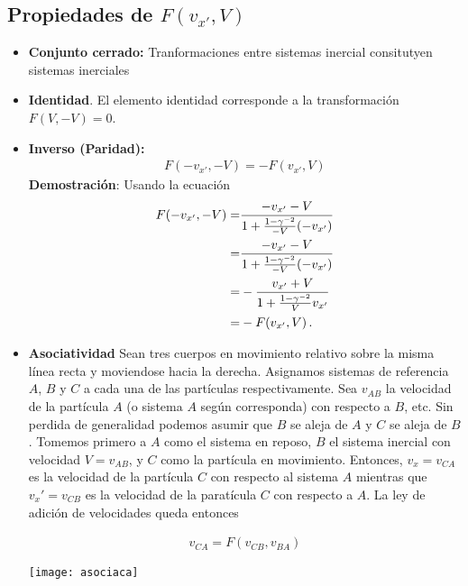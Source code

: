 \subsection{Propiedades de $F(v_{x'},V)$}
\begin{frame}
\begin{itemize}
\item \textbf{Conjunto cerrado:} Tranformaciones entre sistemas
  inercial consitutyen sistemas inerciales
\item \textbf{Identidad}. El elemento identidad corresponde a la
  transformación $F(V,-V)=0$.
\item \textbf{Inverso (Paridad):}
  \begin{align}
    \label{eq:paridad}
    F(-v_{x'},-V)=-F(v_{x'},V)
  \end{align}
\textbf{Demostración}: Usando la ecuación 
\begin{align*}
  F(-v_{x'},-V)=&\frac{-v_{x'}-V}{1+\frac{1-\gamma^{-2}}{-V}(-v_{x'})}\nonumber\\
   =&\frac{-v_{x'}-V}{1+\frac{1-\gamma^{-2}}{-V}(-v_{x'})}\nonumber\\
   =&-\frac{v_{x'}+V}{1+\frac{1-\gamma^{-2}}{V}v_{x'}}\nonumber\\
   =&-F(v_{x'},V)\,.
\end{align*}

\item \textbf{Asociatividad}
Sean tres cuerpos en movimiento relativo sobre la misma línea recta y
moviendose hacia la derecha. Asignamos sistemas de referencia $A$, $B$
y $C$ a cada una de las partículas respectivamente. Sea $v_{AB}$ la
velocidad de la partícula $A$ (o sistema $A$ según corresponda) con
respecto a $B$, etc. Sin perdida de generalidad podemos asumir que $B$
se aleja de $A$ y $C$ se aleja de $B$. Tomemos primero a $A$ como el
sistema en reposo, $B$ el sistema inercial con velocidad $V=v_{AB}$, y
$C$ como la partícula en movimiento. Entonces, $v_x=v_{CA}$ es la
velocidad de la partícula $C$ con respecto al sistema $A$ mientras que
$v_x'=v_{CB}$ es la velocidad de la paratícula $C$ con respecto a $A$. La
ley de adición de velocidades queda entonces

\begin{minipage}{0.4\linewidth}
\begin{align*}
      v_{CA}=F(v_{CB},v_{BA})
\end{align*}  
\end{minipage}
\begin{minipage}{0.6\linewidth}
  \texttt{[image: asociaca]}
\end{minipage}


\end{itemize}
\end{frame}
